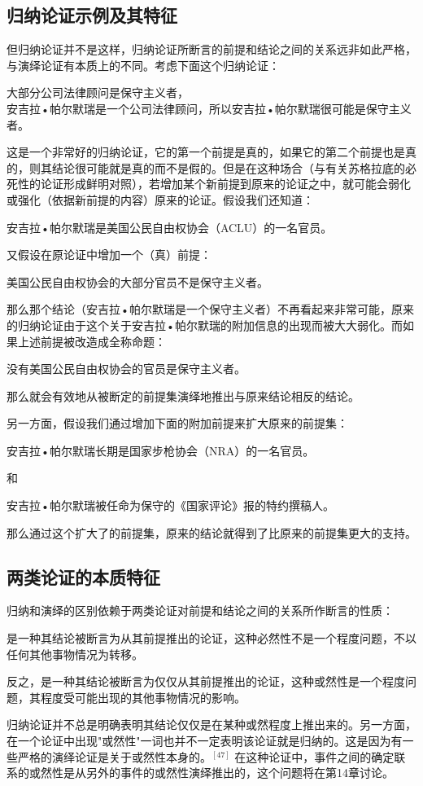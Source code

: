 \subsection{归纳论证示例及其特征}

但归纳论证并不是这样，归纳论证所断言的前提和结论之间的关系远非如此严格，与演绎论证有本质上的不同。考虑下面这个归纳论证：

\begin{displayquote}
大部分公司法律顾问是保守主义者，\\
安吉拉•帕尔默瑞是一个公司法律顾问，所以安吉拉•帕尔默瑞很可能是保守主义者。
\end{displayquote}

这是一个非常好的归纳论证，它的第一个前提是真的，如果它的第二个前提也是真的，则其结论很可能就是真的而不是假的。但是在这种场合（与有关苏格拉底的必死性的论证形成鲜明对照），若增加某个新前提到原来的论证之中，就可能会弱化或强化（依据新前提的内容）原来的论证。假设我们还知道：

安吉拉•帕尔默瑞是美国公民自由权协会（ACLU）的一名官员。

又假设在原论证中增加一个（真）前提：

美国公民自由权协会的大部分官员不是保守主义者。

那么那个结论（安吉拉•帕尔默瑞是一个保守主义者）不再看起来非常可能，原来的归纳论证由于这个关于安吉拉•帕尔默瑞的附加信息的出现而被大大弱化。而如果上述前提被改造成全称命题：

没有美国公民自由权协会的官员是保守主义者。

那么就会有效地从被断定的前提集演绎地推出与原来结论相反的结论。

另一方面，假设我们通过增加下面的附加前提来扩大原来的前提集：

安吉拉•帕尔默瑞长期是国家步枪协会（NRA）的一名官员。

和

安吉拉•帕尔默瑞被任命为保守的《国家评论》报的特约撰稿人。

那么通过这个扩大了的前提集，原来的结论就得到了比原来的前提集更大的支持。

\subsection{两类论证的本质特征}

\begin{theorembox}[title=两类论证的本质特征]
归纳和演绎的区别依赖于两类论证对前提和结论之间的关系所作断言的性质：

是一种其结论被断言为从其前提推出的论证，这种必然性不是一个程度问题，不以任何其他事物情况为转移。

反之，是一种其结论被断言为仅仅从其前提推出的论证，这种或然性是一个程度问题，其程度受可能出现的其他事物情况的影响。
\end{theorembox}

归纳论证并不总是明确表明其结论仅仅是在某种或然程度上推出来的。另一方面，在一个论证中出现"或然性"一词也并不一定表明该论证就是归纳的。这是因为有一些严格的演绎论证是关于或然性本身的。$^{[47]}$ 在这种论证中，事件之间的确定联系的或然性是从另外的事件的或然性演绎推出的，这个问题将在第14章讨论。

